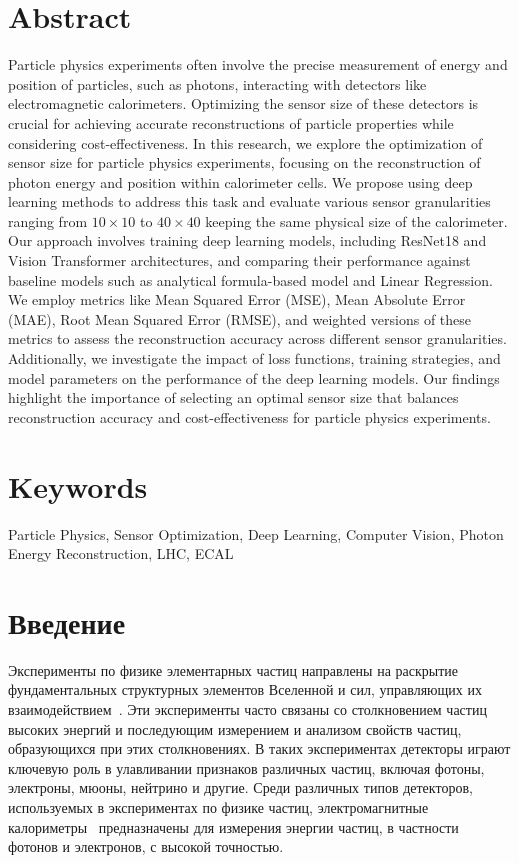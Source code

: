 \documentclass[a4paper,12pt]{extarticle}
\begin{document}
\section*{Abstract}   %
Particle physics experiments often involve the precise measurement of energy and position of particles, such as photons, interacting with detectors like electromagnetic calorimeters. Optimizing the sensor size of these detectors is crucial for achieving accurate reconstructions of particle properties while considering cost-effectiveness. In this research, we explore the optimization of sensor size for particle physics experiments, focusing on the reconstruction of photon energy and position within calorimeter cells. We propose using deep learning methods to address this task and evaluate various sensor granularities ranging from $10 \times 10$ to $40 \times 40$ keeping the same physical size of the calorimeter. Our approach involves training deep learning models, including ResNet18 and Vision Transformer architectures, and comparing their performance against baseline models such as analytical formula-based model and Linear Regression. We employ metrics like Mean Squared Error (MSE), Mean Absolute Error (MAE), Root Mean Squared Error (RMSE), and weighted versions of these metrics to assess the reconstruction accuracy across different sensor granularities. Additionally, we investigate the impact of loss functions, training strategies, and model parameters on the performance of the deep learning models. Our findings highlight the importance of selecting an optimal sensor size that balances reconstruction accuracy and cost-effectiveness for particle physics experiments.


\section*{Keywords}
Particle Physics, Sensor Optimization, Deep Learning, Computer Vision, Photon Energy Reconstruction, LHC, ECAL

\pagebreak

\section{Введение}
\label{section:introduction}

Эксперименты по физике элементарных частиц направлены на раскрытие фундаментальных структурных элементов Вселенной и сил, управляющих их взаимодействием~\cite{Griffiths:1987tj}. Эти эксперименты часто связаны со столкновением частиц высоких энергий и последующим измерением и анализом свойств частиц, образующихся при этих столкновениях. В таких экспериментах детекторы играют ключевую роль в улавливании признаков различных частиц, включая фотоны, электроны, мюоны, нейтрино и другие. Среди различных типов детекторов, используемых в экспериментах по физике частиц, электромагнитные калориметры~\cite{LHCb:2008vvz} предназначены для измерения энергии частиц, в частности фотонов и электронов, с высокой точностью.
\end{document}
